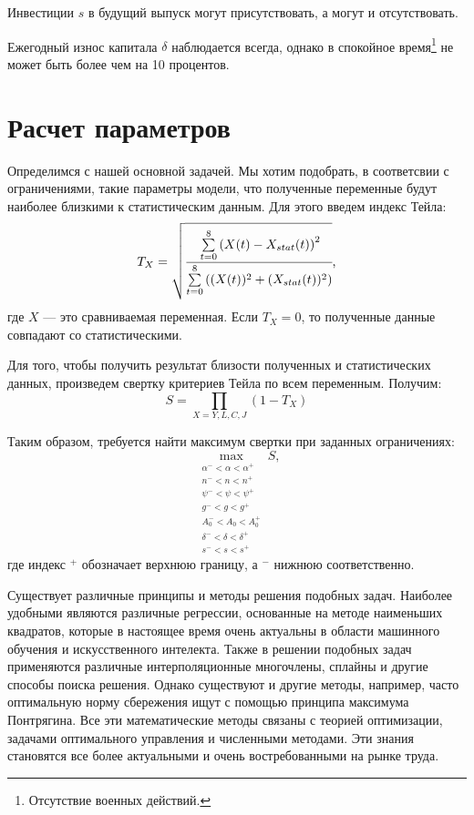 Инвестиции $s$ в будущий выпуск могут присутствовать, а могут и отсутствовать.

Ежегодный износ капитала $\delta$ наблюдается всегда, однако в спокойное время\footnote{Отсутствие военных действий.} не может быть более чем на 10 процентов.

\section{Расчет параметров}

Определимся с нашей основной задачей.
Мы хотим подобрать, в соответсвии с ограничениями, такие параметры модели, что полученные переменные будут наиболее близкими к статистическим данным.
Для этого введем индекс Тейла:
\begin{equation*}
	T_{X} = \sqrt{\cfrac{\sum\limits_{t = 0}^{8}\left(X(t) - X_{stat}(t)\right)^2}{\sum\limits_{t = 0}^{8}\left((X(t))^2 + (X_{stat}(t))^2\right)}}\text{,}
\end{equation*}
где $X$ --- это сравниваемая переменная.
Если $T_{X} = 0$, то полученные данные совпадают со статистическими.

Для того, чтобы получить результат близости полученных и статистических данных, произведем свертку критериев Тейла по всем переменным.
Получим:
\begin{equation*}
S=\prod\limits_{X=Y,L,C,J}\left(1 -T_{X}\right)
\end{equation*}

Таким образом, требуется найти максимум свертки при заданных ограничениях:
\begin{equation*}
\max_{\substack{\alpha^- < \alpha < \alpha^+ \\ n^- < n < n^+ \\ \psi^- < \psi < \psi^+ \\ g^- < g < g^+ \\ A_0^- < A_0 < A_0^+ \\ \delta^- < \delta < \delta^+\\ s^- < s < s^+}} S \text{,}
\end{equation*}
где индекс $^+$ обозначает верхнюю границу, а $^-$ нижнюю соответственно.

Существует различные принципы и методы решения подобных задач.
Наиболее удобными являются различные регрессии, основанные на методе наименьших квадратов, которые в настоящее время очень актуальны в области машинного обучения и искусственного интелекта.
Также в решении подобных задач применяются различные интерполяционные многочлены, сплайны и другие способы поиска решения.
Однако существуют и другие методы, например, часто оптимальную норму сбережения ищут с помощью принципа максимума Понтрягина.
Все эти математические методы связаны с теорией оптимизации, задачами оптимального управления и численными методами.
Эти знания становятся все более актуальными и очень востребованными на рынке труда.

